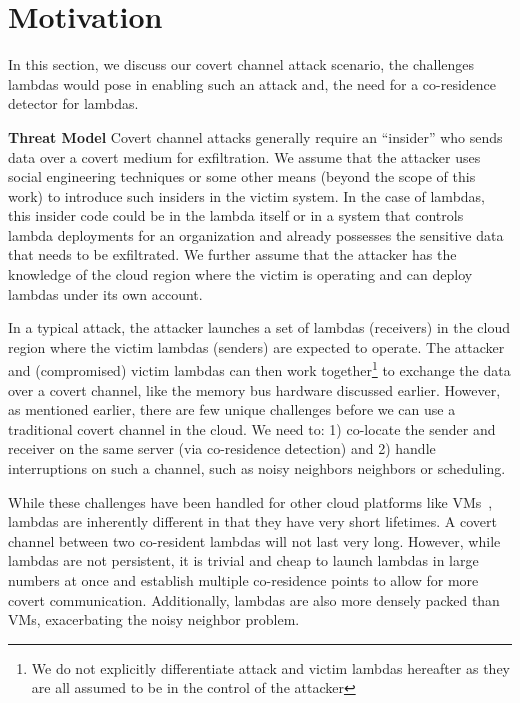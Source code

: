
\section{Motivation}
\label{sec:motivation}

In this section, we discuss our covert channel attack scenario, the challenges
lambdas would pose in enabling such an attack and, the need for a co-residence
detector for lambdas.

\textbf{Threat Model}
Covert channel attacks generally require an ``insider'' who sends data over a
covert medium for exfiltration. We assume that the attacker uses social
engineering techniques or some other means (beyond the scope of this work) to
introduce  such insiders in the victim system. In the case of lambdas, this
insider code could be in the lambda itself or in a system that controls lambda
deployments for an organization and already possesses the sensitive data that
needs to be exfiltrated.  We further assume that the attacker has the knowledge
of the cloud region where the victim is operating and can deploy lambdas under
its own account.

In a typical attack, the attacker launches a set of lambdas (receivers) in the
cloud region where the victim lambdas (senders) are expected to operate. The
attacker and (compromised) victim lambdas can then work together\footnote{We
do not explicitly differentiate attack and victim lambdas hereafter as they are
all assumed to be in the control of the attacker} to exchange the data over a covert
channel, like the memory bus hardware discussed earlier.  However, as
mentioned earlier, there are few unique challenges before we can use a
traditional covert channel in the cloud. We need to: 1) co-locate the sender and
receiver on the same server (via co-residence detection) and 2)
handle interruptions on such a channel, such as noisy neighbors
neighbors or scheduling.

While these challenges have been handled for other cloud platforms like 
VMs~\cite{varad191016,wuusenix2012}, lambdas are inherently different in that they have very short
lifetimes. A covert channel between two co-resident lambdas will not last very
long. However, while lambdas are not persistent, it is trivial and cheap to
launch lambdas in large numbers at once and establish multiple co-residence
points to allow for more covert communication.  Additionally, lambdas are also
more densely packed than VMs, exacerbating the noisy neighbor problem.

